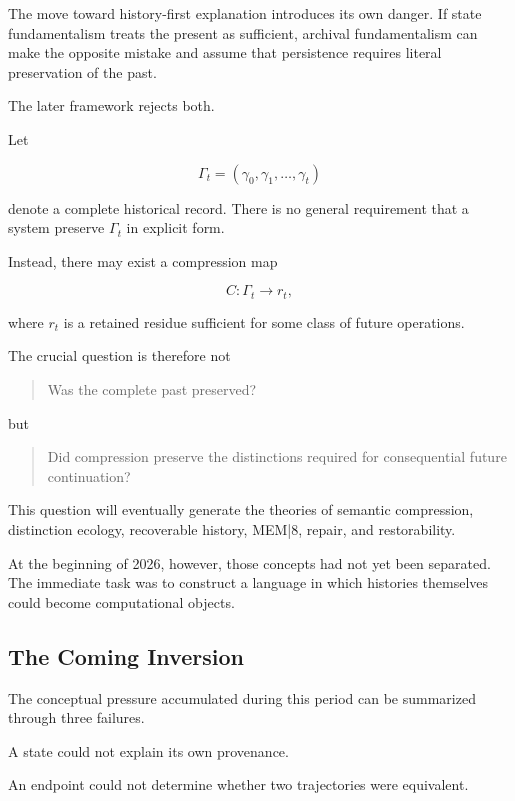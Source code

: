 \documentclass[11pt]{article}
\theoremstyle{remark}
\newcommand{\MEM}{\textsc{MEM|8}}
\begin{document}
The move toward history-first explanation introduces its own danger. If state fundamentalism treats the present as sufficient, archival fundamentalism can make the opposite mistake and assume that persistence requires literal preservation of the past.

The later framework rejects both.

Let

\begin{equation}
\Gamma_t
=
(\gamma_0,\gamma_1,\ldots,\gamma_t)
\end{equation}

denote a complete historical record. There is no general requirement that a system preserve $\Gamma_t$ in explicit form.

Instead, there may exist a compression map

\begin{equation}
C :
\Gamma_t
\rightarrow
r_t,
\end{equation}

where $r_t$ is a retained residue sufficient for some class of future operations.

The crucial question is therefore not

\begin{quote}
Was the complete past preserved?
\end{quote}

but

\begin{quote}
Did compression preserve the distinctions required for consequential future continuation?
\end{quote}

This question will eventually generate the theories of semantic compression, distinction ecology, recoverable history, \MEM{}, repair, and restorability.

At the beginning of 2026, however, those concepts had not yet been separated. The immediate task was to construct a language in which histories themselves could become computational objects.

\subsection{The Coming Inversion}

The conceptual pressure accumulated during this period can be summarized through three failures.

A state could not explain its own provenance.

An endpoint could not determine whether two trajectories were equivalent.
\end{document}

